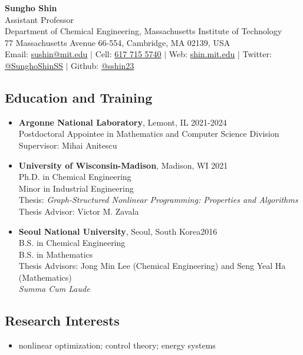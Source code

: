 \documentclass[letterpaper, 11pt]{article}
\begin{document}
\thispagestyle{empty}
\begin{center}
  {\bf\Large Sungho Shin}\\[.25em]
  Assistant Professor\\
Department of Chemical Engineering, Massachusetts Institute of Technology
\\
  77 Massachusetts Avenue 66-554, Cambridge, MA 02139, USA
\\
  Email: \href{mailto:sushin@mit.edu}{sushin@mit.edu} $|$ Cell: \href{tel:6177155740}{617 715 5740} $|$ Web: \href{https://shin.mit.edu}{shin.mit.edu} $|$ Twitter: \href{https://twitter.com/SunghoShinSS}{@SunghoShinSS} $|$ Github: \href{https://github.com/sshin23}{@sshin23} 
\end{center}


\subsection*{Education and Training}
\begin{itemize}[leftmargin=*]
\item[]
  {\bf Argonne National Laboratory}, Lemont, IL \hfill 2021-2024\\
  Postdoctoral Appointee in {Mathematics and Computer Science Division} \\
  Supervisor: Mihai Anitescu
\item[]
  {\bf University of Wisconsin-Madison}, Madison, WI \hfill 2021\\
  {Ph.D. in Chemical Engineering} \\
  {Minor in Industrial Engineering}\\
  Thesis: {\it Graph-Structured Nonlinear Programming: Properties and Algorithms}\\
  Thesis Advisor: Victor M. Zavala
\item[]
  {\bf Seoul National University}, Seoul, South Korea\hfill 2016 \\
  {B.S. in Chemical Engineering}\\
  {B.S. in Mathematics}\\
  Thesis Advisors: Jong Min Lee (Chemical Engineering) and Seng Yeal Ha (Mathematics)\\
  {\it Summa Cum Laude}
\end{itemize}

\subsection*{Research Interests}
\begin{itemize}[leftmargin=*]
\item[]  nonlinear optimization; control theory; energy systems
\end{itemize}
\end{document}
